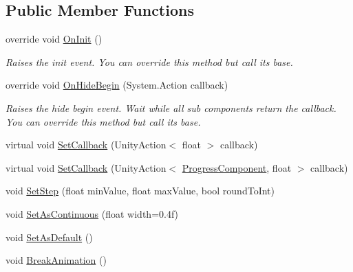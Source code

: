 \subsection*{Public Member Functions}
\begin{DoxyCompactItemize}
\item 
override void \hyperlink{class_unity_engine_1_1_u_i_1_1_windows_1_1_components_1_1_progress_component_adfd87984504db6aff87ff639cc32310d}{On\+Init} ()
\begin{DoxyCompactList}\small\item\em Raises the init event. You can override this method but call it\textquotesingle{}s base. \end{DoxyCompactList}\item 
override void \hyperlink{class_unity_engine_1_1_u_i_1_1_windows_1_1_components_1_1_progress_component_a13024370395e3748b049d062c8499d8a}{On\+Hide\+Begin} (System.\+Action callback)
\begin{DoxyCompactList}\small\item\em Raises the hide begin event. Wait while all sub components return the callback. You can override this method but call it\textquotesingle{}s base. \end{DoxyCompactList}\item 
virtual void \hyperlink{class_unity_engine_1_1_u_i_1_1_windows_1_1_components_1_1_progress_component_aca6331959a099993f4a0977ad181ddea}{Set\+Callback} (Unity\+Action$<$ float $>$ callback)
\item 
virtual void \hyperlink{class_unity_engine_1_1_u_i_1_1_windows_1_1_components_1_1_progress_component_ace3dcb0972be8f558762533147181aea}{Set\+Callback} (Unity\+Action$<$ \hyperlink{class_unity_engine_1_1_u_i_1_1_windows_1_1_components_1_1_progress_component}{Progress\+Component}, float $>$ callback)
\item 
void \hyperlink{class_unity_engine_1_1_u_i_1_1_windows_1_1_components_1_1_progress_component_afee39eadfb1f9acd0e4a75b1fb27c956}{Set\+Step} (float min\+Value, float max\+Value, bool round\+To\+Int)
\item 
void \hyperlink{class_unity_engine_1_1_u_i_1_1_windows_1_1_components_1_1_progress_component_a6d4e7ada7364ddbd6a52276f639148a6}{Set\+As\+Continuous} (float width=0.\+4f)
\item 
void \hyperlink{class_unity_engine_1_1_u_i_1_1_windows_1_1_components_1_1_progress_component_a34d708b3f8eeb2ca4cd352d79d2c103e}{Set\+As\+Default} ()
\item 
void \hyperlink{class_unity_engine_1_1_u_i_1_1_windows_1_1_components_1_1_progress_component_a4a0427abdfcd2abe14a55b26a3031175}{Break\+Animation} ()

\end{DoxyCompactItemize}

